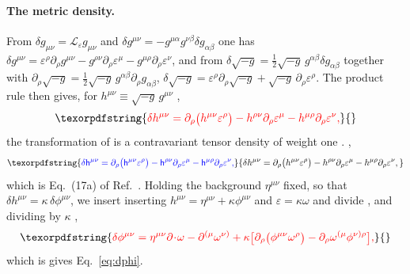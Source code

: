 \documentclass[prd,aps,preprint,superscriptaddress,nofootinbib,amsmath,amssymb,eqsecnum]{revtex4-2}
\providecommand{\DIFaddtex}[1]{{\protect\color{blue} \sf #1}} %
\providecommand{\DIFdeltex}[1]{{\protect\color{red} \scriptsize #1}} %
\providecommand{\DIFaddbegin}{} %
\providecommand{\DIFaddend}{} %
\providecommand{\DIFdelbegin}{} %
\providecommand{\DIFdelend}{} %
\providecommand{\DIFadd}[1]{\texorpdfstring{\DIFaddtex{#1}}{#1}} %
\providecommand{\DIFdel}[1]{\texorpdfstring{\DIFdeltex{#1}}{}} %
\begin{document}
\paragraph{The metric density.} \DIFdelbegin \DIFdel{From $\delta g_{\mu\nu}=\mathcal{L}_\varepsilon g_{\mu\nu}$
and $\delta g^{\mu\nu}=-g^{\mu\alpha}g^{\nu\beta}\delta g_{\alpha\beta}$ one has
$\delta g^{\mu\nu}=\varepsilon^\rho\partial_\rho g^{\mu\nu}-g^{\rho\nu}\partial_\rho\varepsilon^\mu
-g^{\mu\rho}\partial_\rho\varepsilon^\nu$, and from
$\delta\sqrt{-g}=\tfrac12\sqrt{-g}\,g^{\alpha\beta}\delta g_{\alpha\beta}$ together with
$\partial_\rho\sqrt{-g}=\tfrac12\sqrt{-g}\,g^{\alpha\beta}\partial_\rho g_{\alpha\beta}$,
$\delta\sqrt{-g}=\varepsilon^\rho\partial_\rho\sqrt{-g}+\sqrt{-g}\,\partial_\rho\varepsilon^\rho$.
The product rule then gives, for }\DIFdelend $h^{\mu\nu}\equiv\sqrt{-g}\,g^{\mu\nu}$ \DIFdelbegin \DIFdel{,
}\begin{displaymath}
\DIFdel{\delta h^{\mu\nu}=\partial_\rho\big(h^{\mu\nu}\varepsilon^\rho\big)
-h^{\rho\nu}\partial_\rho\varepsilon^\mu-h^{\mu\rho}\partial_\rho\varepsilon^\nu ,
}\end{displaymath}%
\DIFdel{the transformation of }\DIFdelend \DIFaddbegin \DIFadd{is }\DIFaddend a contravariant
tensor density of weight one\DIFdelbegin \DIFdel{. }\DIFdelend \DIFaddbegin \DIFadd{,
}\begin{equation}
\DIFadd{\delta h^{\mu\nu}=\partial_\rho\big(h^{\mu\nu}\varepsilon^\rho\big)
-h^{\rho\nu}\partial_\rho\varepsilon^\mu-h^{\mu\rho}\partial_\rho\varepsilon^\nu ,
\label{eq:dh}
}\end{equation}
\DIFadd{which is Eq.~(17a) of Ref.~\cite{BrandtMcKeon2015}. }\DIFaddend Holding the background $\eta^{\mu\nu}$
fixed, so that $\delta h^{\mu\nu}=\kappa\,\delta\phi^{\mu\nu}$, \DIFdelbegin \DIFdel{we insert
}\DIFdelend \DIFaddbegin \DIFadd{inserting
}\DIFaddend $h^{\mu\nu}=\eta^{\mu\nu}+\kappa\phi^{\mu\nu}$ and $\varepsilon=\kappa\omega$\DIFdelbegin \DIFdel{and divide }\DIFdelend \DIFaddbegin \DIFadd{, and dividing }\DIFaddend by
$\kappa$ \DIFdelbegin \DIFdel{,
}\begin{displaymath}
\DIFdel{\delta\phi^{\mu\nu}=\eta^{\mu\nu}\partial\!\cdot\!\omega-\partial^{(\mu}\omega^{\nu)}
+\kappa\Big[\partial_\rho\big(\phi^{\mu\nu}\omega^\rho\big)-\partial_\rho\omega^{(\mu}\phi^{\nu)\rho}\Big],
}\end{displaymath}%
\DIFdel{which is }\DIFdelend \DIFaddbegin \DIFadd{gives }\DIFaddend Eq.~\eqref{eq:dphi}.
\end{document}
